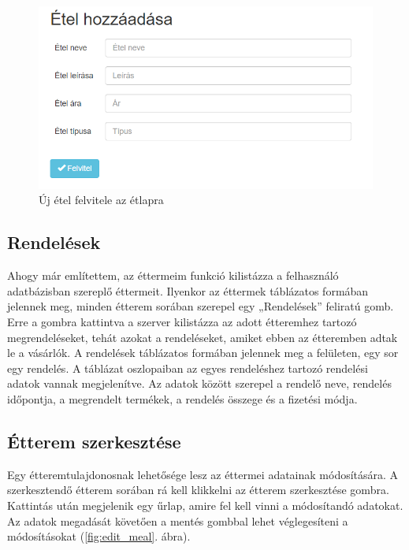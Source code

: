 \begin{figure}
\centering
\includegraphics[scale=0.8]{kepek/add_meal.png}
\caption{Új étel felvitele az étlapra}
\label{fig:add_meal}
\end{figure}

\subsection{Rendelések}

Ahogy már említettem, az éttermeim funkció kilistázza a felhasználó adatbázisban szereplő éttermeit. Ilyenkor az éttermek táblázatos formában jelennek meg, minden étterem sorában szerepel egy „Rendelések” feliratú gomb. Erre a gombra kattintva a szerver kilistázza az adott étteremhez tartozó megrendeléseket, tehát azokat a rendeléseket, amiket ebben az étteremben adtak le a vásárlók. A rendelések táblázatos formában jelennek meg a felületen, egy sor egy rendelés. A táblázat oszlopaiban az egyes rendeléshez tartozó rendelési adatok vannak megjelenítve. Az adatok között szerepel a rendelő neve, rendelés időpontja, a megrendelt termékek, a rendelés összege és a fizetési módja.

\subsection{Étterem szerkesztése}

Egy étteremtulajdonosnak lehetősége lesz az éttermei adatainak módosítására. A szerkesztendő étterem sorában rá kell klikkelni az étterem szerkesztése gombra. Kattintás után megjelenik egy űrlap, amire fel kell vinni a módosítandó adatokat. Az adatok megadását követően a mentés gombbal lehet véglegesíteni a módosításokat (\ref{fig:edit_meal}. ábra).

